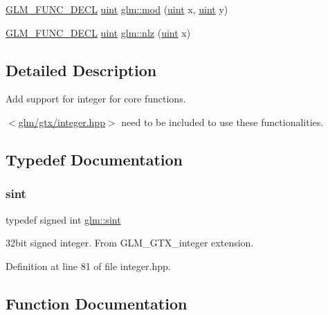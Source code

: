 \begin{DoxyCompactItemize}
\item 
\hyperlink{setup_8hpp_ab2d052de21a70539923e9bcbf6e83a51}{G\+L\+M\+\_\+\+F\+U\+N\+C\+\_\+\+D\+E\+CL} \hyperlink{group__core__precision_ga4fd29415871152bfb5abd588334147c8}{uint} \hyperlink{group__gtx__integer_gab8f9ec0ca93ca90669434224818f0750}{glm\+::mod} (\hyperlink{group__core__precision_ga4fd29415871152bfb5abd588334147c8}{uint} x, \hyperlink{group__core__precision_ga4fd29415871152bfb5abd588334147c8}{uint} y)
\item 
\hyperlink{setup_8hpp_ab2d052de21a70539923e9bcbf6e83a51}{G\+L\+M\+\_\+\+F\+U\+N\+C\+\_\+\+D\+E\+CL} \hyperlink{group__core__precision_ga4fd29415871152bfb5abd588334147c8}{uint} \hyperlink{group__gtx__integer_gacbe62fd2384464c16ea30ecc4defc11c}{glm\+::nlz} (\hyperlink{group__core__precision_ga4fd29415871152bfb5abd588334147c8}{uint} x)
\end{DoxyCompactItemize}


\subsection{Detailed Description}
Add support for integer for core functions. 

$<$\hyperlink{gtx_2integer_8hpp}{glm/gtx/integer.\+hpp}$>$ need to be included to use these functionalities. 

\subsection{Typedef Documentation}
\mbox{\label{group__gtx__integer_ga73643e09d8c6d362418aec541fdb987d}} 
\subsubsection{\texorpdfstring{sint}{sint}}
{\footnotesize\ttfamily typedef signed int \hyperlink{group__gtx__integer_ga73643e09d8c6d362418aec541fdb987d}{glm\+::sint}}

32bit signed integer. From G\+L\+M\+\_\+\+G\+T\+X\+\_\+integer extension. 

Definition at line 81 of file integer.\+hpp.



\subsection{Function Documentation}
\mbox{\label{group__gtx__integer_ga8cbd3120905f398ec321b5d1836e08fb}} 
